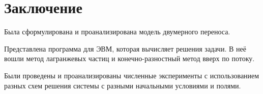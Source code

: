 \chapter{Заключение}
Была сформулирована и проанализирована модель двумерного переноса.

Представлена программа для ЭВМ, которая вычисляет решения задачи.
В неё вошли метод лагранжевых частиц и конечно-разностный метод вверх по потоку.

Были проведены и проанализированы численные эксперименты с использованием разных схем решения системы с разными начальными условиями и полями.